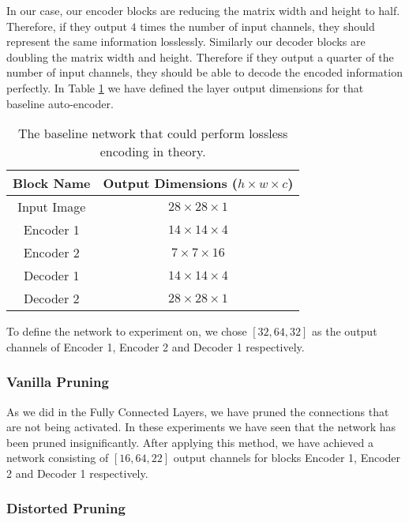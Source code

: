 In our case, our encoder blocks are reducing the matrix width and height to half. Therefore, if they output $4$ times the number of input channels, they should represent the same information losslessly. Similarly our decoder blocks are doubling the matrix width and height. Therefore if they output a quarter of the number of input channels, they should be able to decode the encoded information perfectly. In Table \ref{tab:mnist_baseline_encoder} we have defined the layer output dimensions for that baseline auto-encoder.
\begin{table}
\begin{center}
\begin{tabular}{ c | c }
 Block Name & Output Dimensions ($h \times w \times c$) \\
 \hline
 Input Image & $28 \times 28 \times 1$ \\
 Encoder 1 & $14 \times 14 \times 4$ \\  
 Encoder 2 & $7 \times 7 \times 16$ \\
 Decoder 1 & $14 \times 14 \times 4$ \\  
 Decoder 2 & $28 \times 28 \times 1$ 
\end{tabular}
\end{center}
\caption{The baseline network that could perform lossless encoding in theory.}
\label{tab:mnist_baseline_encoder}
\end{table}

To define the network to experiment on, we chose $[32, 64, 32]$ as the output channels of Encoder 1, Encoder 2 and Decoder 1 respectively.


\subsubsection{Vanilla Pruning}
As we did in the Fully Connected Layers, we have pruned the connections that are not being activated. In these experiments we have seen that the network has been pruned insignificantly. After applying this method, we have achieved a network consisting of $[16, 64, 22]$ output channels for blocks Encoder 1, Encoder 2 and Decoder 1 respectively.

\subsubsection{Distorted Pruning}

